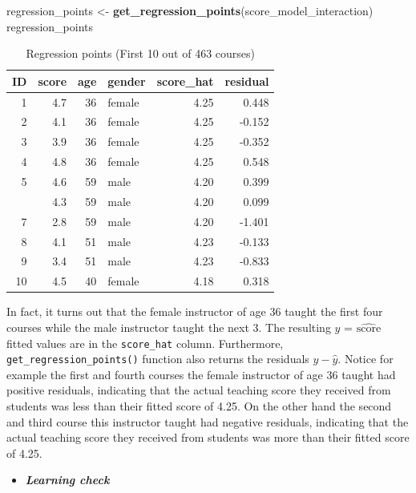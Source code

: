 \documentclass[12pt, krantz2,]{krantz}
\makeatletter
\newenvironment{Shaded}{\begin{snugshade}}{\end{snugshade}}
\newcommand{\KeywordTok}[1]{\textcolor[rgb]{0.27,0.27,0.27}{\textbf{#1}}}
\newcommand{\NormalTok}[1]{#1}
\newcommand{\StringTok}[1]{\textcolor[rgb]{0.5,0.5,0.5}{#1}}
\newenvironment{kframe}{%
\medskip{}
\setlength{\fboxsep}{.8em}
 \def\at@end@of@kframe{}%
 \ifinner\ifhmode%
  \def\at@end@of@kframe{\end{minipage}}%
  \begin{minipage}{\columnwidth}%
 \fi\fi%
 \def\FrameCommand##1{\hskip\@totalleftmargin \hskip-\fboxsep
 \colorbox{shadecolor}{##1}\hskip-\fboxsep
     \hskip-\linewidth \hskip-\@totalleftmargin \hskip\columnwidth}%
 \MakeFramed {\advance\hsize-\width
   \@totalleftmargin\z@ \linewidth\hsize
   \@setminipage}}%
 {\par\unskip\endMakeFramed%
 \at@end@of@kframe}
\renewenvironment{Shaded}{\begin{kframe}}{\end{kframe}}
\newenvironment{rmdblock}[1]
  {\begin{shaded*}
  \begin{itemize}
  \renewcommand{\labelitemi}{
    \raisebox{-.7\height}[0pt][0pt]{
    }
  }
  \item
  }
  {
  \end{itemize}
  \end{shaded*}
  }
\newenvironment{learncheck}
  {\begin{rmdblock}{warning}}
  {\end{rmdblock}}
\makeatother
\begin{document}
\begin{Shaded}
\begin{Highlighting}[]
\NormalTok{regression_points <-}\StringTok{ }\KeywordTok{get_regression_points}\NormalTok{(score_model_interaction)}
\NormalTok{regression_points}
\end{Highlighting}
\end{Shaded}

\begin{table}[H]

\caption{\label{tab:model4-points-table}Regression points (First 10 out of 463 courses)}
\centering
\fontsize{10}{12}\selectfont
\begin{tabular}{rrrlrr}
\toprule
ID & score & age & gender & score\_hat & residual\\
\midrule
1 & 4.7 & 36 & female & 4.25 & 0.448\\
2 & 4.1 & 36 & female & 4.25 & -0.152\\
3 & 3.9 & 36 & female & 4.25 & -0.352\\
4 & 4.8 & 36 & female & 4.25 & 0.548\\
5 & 4.6 & 59 & male & 4.20 & 0.399\\
\addlinespace
6 & 4.3 & 59 & male & 4.20 & 0.099\\
7 & 2.8 & 59 & male & 4.20 & -1.401\\
8 & 4.1 & 51 & male & 4.23 & -0.133\\
9 & 3.4 & 51 & male & 4.23 & -0.833\\
10 & 4.5 & 40 & female & 4.18 & 0.318\\
\bottomrule
\end{tabular}
\end{table}

In fact, it turns out that the female instructor of age 36 taught the first four courses while the male instructor taught the next 3. The resulting \(\widehat{y}\) = \(\widehat{\text{score}}\) fitted values are in the \texttt{score\_hat} column. Furthermore, \texttt{get\_regression\_points()} function also returns the residuals \(y-\widehat{y}\). Notice for example the first and fourth courses the female instructor of age 36 taught had positive residuals, indicating that the actual teaching score they received from students was less than their fitted score of 4.25. On the other hand the second and third course this instructor taught had negative residuals, indicating that the actual teaching score they received from students was more than their fitted score of 4.25.

\begin{learncheck}
\textbf{\emph{Learning check}}
\end{learncheck}
\end{document}
